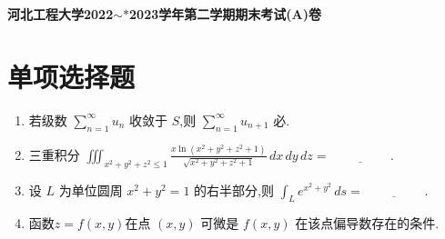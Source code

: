 \setcounter{section}{0}
\begin{center}
	\textbf{河北工程大学2022$\sim*$2023学年第二学期期末考试(A)卷}
\end{center}

\section{单项选择题}

\begin{enumerate}
	\item 若级数 $\sum_{n=1}^{\infty}u_n$ 收敛于 $S$,则 $\sum_{n=1}^{\infty}u_{n+1}$ 必\underline{\hspace{2cm}}.
	
	\item 三重积分
	$
	\iiint_{x^2+y^2+z^2\le 1}\frac{x\ln(x^2+y^2+z^2+1)}{\sqrt{x^2+y^2+z^2+1}}\,dx\,dy\,dz=\underline{\hspace{2cm}}.
	$
	
	\item 设 $L$ 为单位圆周 $x^2+y^2=1$ 的右半部分,则
	$
	\int_L e^{x^2+y^2}\,ds=\underline{\hspace{2cm}}.
	$
	
	\item 函数$z = f(x,y)$在点 $(x,y)$ 可微是 $f(x,y)$ 在该点偏导数存在的\underline{\hspace{2cm}}条件.
	

\end{enumerate}

